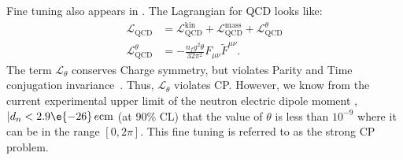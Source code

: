 %


Fine tuning also appears in .
The Lagrangian for QCD looks like:
\begin{align}
  \mathcal{L}_\mathrm{QCD} &=
  \mathcal{L}_\mathrm{QCD}^\mathrm{kin} +
  \mathcal{L}_\mathrm{QCD}^\mathrm{mass} +
  \mathcal{L}_\mathrm{QCD}^\theta \\
  \mathcal{L}_\mathrm{QCD}^\theta &=
  -\frac{n_fg^2\theta}{32\pi^2}F_{\mu\nu}\tilde F^{\mu\nu}.
\end{align}
The term $\mathcal{L}_\theta$ conserves Charge symmetry, but violates Parity and Time conjugation
invariance~\cite{Peccei:2006as}.
Thus, $\mathcal{L}_\theta$ violates CP.
However, we know from the current experimental upper limit of the neutron electric dipole moment
\cite{Baker:2006ts},
$|d_n <2.9\e{-26}\,e\mathrm{cm}$ (at 90\% CL) that the value of $\theta$ is less than $10^{-9}$
where it can be in the range $[0,2\pi]$.
This fine tuning is referred to as the strong CP problem.













